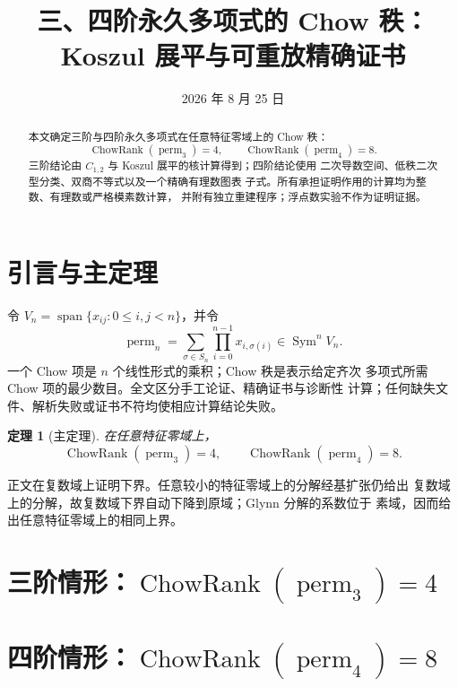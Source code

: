 \documentclass[10pt,a4paper,reqno]{amsart}
\title[三、四阶永久多项式的 Chow 秩]
{三、四阶永久多项式的 Chow 秩：\\
Koszul 展平与可重放精确证书}
\author{}
\date{2026 年 8 月 25 日}
\newtheorem{theorem}{定理}[section]
\theoremstyle{definition}
\newcommand{\Sym}{\operatorname{Sym}}
\newcommand{\Span}{\operatorname{span}}
\newcommand{\ChowRank}{\operatorname{ChowRank}}
\newcommand{\perm}{\operatorname{perm}}
\begin{document}
\begin{abstract}
本文确定三阶与四阶永久多项式在任意特征零域上的 Chow 秩：
\[
  \ChowRank(\perm_3)=4,\qquad \ChowRank(\perm_4)=8.
\]
三阶结论由 \(C_{1,2}\) 与 Koszul 展平的核计算得到；四阶结论使用
二次导数空间、低秩二次型分类、双商不等式以及一个精确有理数图表
子式。所有承担证明作用的计算均为整数、有理数或严格模素数计算，
并附有独立重建程序；浮点数实验不作为证明证据。
\end{abstract}
\maketitle

\section{引言与主定理}

令 \(V_n=\Span\{x_{ij}:0\leq i,j<n\}\)，并令
\[
  \perm_n=\sum_{\sigma\in S_n}\prod_{i=0}^{n-1}x_{i,\sigma(i)}
  \in\Sym^nV_n.
\]
一个 Chow 项是 \(n\) 个线性形式的乘积；Chow 秩是表示给定齐次
多项式所需 Chow 项的最少数目。全文区分手工论证、精确证书与诊断性
计算；任何缺失文件、解析失败或证书不符均使相应计算结论失败。

\begin{theorem}[主定理]\label{thm:main}
在任意特征零域上，
\[
  \ChowRank(\perm_3)=4,\qquad
  \ChowRank(\perm_4)=8.
\]
\end{theorem}

正文在复数域上证明下界。任意较小的特征零域上的分解经基扩张仍给出
复数域上的分解，故复数域下界自动下降到原域；Glynn 分解的系数位于
素域，因而给出任意特征零域上的相同上界。

\section{三阶情形：\texorpdfstring{$\ChowRank(\perm_3)=4$}{ChowRank(perm3)=4}}


\section{四阶情形：\texorpdfstring{$\ChowRank(\perm_4)=8$}{ChowRank(perm4)=8}}

\end{document}
